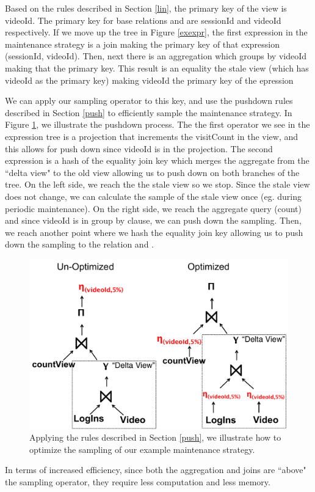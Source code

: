 Based on the rules described in Section \ref{lin}, the primary key of the view is \textsf{videoId}.
The primary key for base relations  and  are \textsf{sessionId} and \textsf{videoId} respectively.
If we move up the tree in Figure \ref{exexpr}, the first expression in the maintenance strategy is a join making the primary key of that expression (\textsf{sessionId}, \textsf{videoId}).
Then, next there is an aggregation which groups by \textsf{videoId} making that the primary key.
This result is an equality the stale view (which has \textsf{videoId} as the primary key) making \textsf{videoId} the primary key of the epression

We can apply our sampling operator to this key, and use the pushdown rules described in Section \ref{push} to efficiently sample the maintenance strategy.
In Figure \ref{exexpr2}, we illustrate the pushdown process.
The the first operator we see in the expression tree is a projection that increments the \textsf{visitCount} in the view, and this allows
for push down since \textsf{videoId} is in the projection.
The second expression is a hash of the equality join key which merges the aggregate from the ``delta view" to the old view allowing us to push down on both branches of the tree.
On the left side, we reach the the stale view so we stop.
Since the stale view does not change, we can calculate the sample of the stale view once (eg. during periodic maintenance). 
On the right side, we reach the aggregate query (count) and since \textsf{videoId} is in group by clause, we can push down the sampling.
Then, we reach another point where we hash the equality join key allowing us to push down the sampling to the relation  and .

\begin{figure}[t] \vspace{-2em}
\centering
 \includegraphics[scale=0.23]{figs/example_expression_tree_2.pdf} \vspace{-.25em}
 \caption{Applying the rules described in Section \ref{push}, we illustrate how to optimize the sampling of our example maintenance strategy.  \label{exexpr2}}\vspace{-1.75em}
\end{figure}

In terms of increased efficiency, since both the aggregation and joins are ``above" the sampling operator, they require less computation and less memory.


